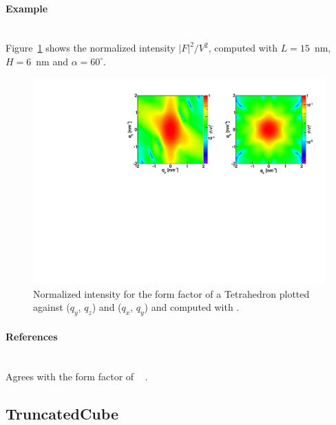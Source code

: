 \paragraph{Example}\strut\\
Figure~\ref{fig:FFtetrahEx} shows the normalized intensity
$|F|^2/V^2$, computed with $L=15$~nm, $H=6$~nm and $\alpha =60
^{\circ}$.

\begin{figure}[H]
\begin{center}
\includegraphics[angle=-90,width=\textwidth]{fig/ff/figfftetrahedron.pdf}
\end{center}
\caption{Normalized intensity for the form factor of a Tetrahedron
  plotted against ($q_y$, $q_z$) and  ($q_x$, $q_y$) and
  computed with .}
\label{fig:FFtetrahEx}
\end{figure}

\paragraph{References}\strut\\
Agrees with the  form factor of \IsGISAXS\
\cite[Eq.~2.30]{Laz08} \cite[Eq.~220]{ReLL09}.


\clearpage
\subsection{TruncatedCube} \label{sec:TruncatedCube}  


